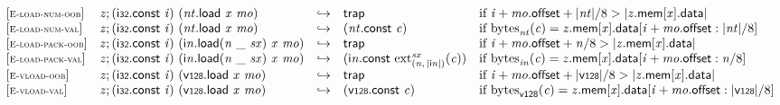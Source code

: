 $$
\begin{array}{@{}l@{}lcl@{}l@{}}
{[\textsc{\scriptsize E{-}load{-}num{-}oob}]} \quad & {\mathit{z}} ; (\mathsf{i{\scriptstyle32}}.\mathsf{const}~{\mathit{i}})~({\mathit{nt}}.\mathsf{load}~{\mathit{x}}~{\mathit{mo}}) &\hookrightarrow& \mathsf{trap} &\quad
  \mbox{if}~{\mathit{i}} + {\mathit{mo}}.\mathsf{offset} + {|{\mathit{nt}}|} / 8 > {|{{\mathit{z}}.\mathsf{mem}}{[{\mathit{x}}]}.\mathsf{data}|} \\
{[\textsc{\scriptsize E{-}load{-}num{-}val}]} \quad & {\mathit{z}} ; (\mathsf{i{\scriptstyle32}}.\mathsf{const}~{\mathit{i}})~({\mathit{nt}}.\mathsf{load}~{\mathit{x}}~{\mathit{mo}}) &\hookrightarrow& ({\mathit{nt}}.\mathsf{const}~{\mathit{c}}) &\quad
  \mbox{if}~{{\mathrm{bytes}}}_{{\mathit{nt}}}({\mathit{c}}) = {{\mathit{z}}.\mathsf{mem}}{[{\mathit{x}}]}.\mathsf{data}[{\mathit{i}} + {\mathit{mo}}.\mathsf{offset} : {|{\mathit{nt}}|} / 8] \\
{[\textsc{\scriptsize E{-}load{-}pack{-}oob}]} \quad & {\mathit{z}} ; (\mathsf{i{\scriptstyle32}}.\mathsf{const}~{\mathit{i}})~({{\mathsf{i}}{{\mathit{n}}}.\mathsf{load}}{({\mathit{n}}~\mathsf{\_}~{\mathit{sx}})}~{\mathit{x}}~{\mathit{mo}}) &\hookrightarrow& \mathsf{trap} &\quad
  \mbox{if}~{\mathit{i}} + {\mathit{mo}}.\mathsf{offset} + {\mathit{n}} / 8 > {|{{\mathit{z}}.\mathsf{mem}}{[{\mathit{x}}]}.\mathsf{data}|} \\
{[\textsc{\scriptsize E{-}load{-}pack{-}val}]} \quad & {\mathit{z}} ; (\mathsf{i{\scriptstyle32}}.\mathsf{const}~{\mathit{i}})~({{\mathsf{i}}{{\mathit{n}}}.\mathsf{load}}{({\mathit{n}}~\mathsf{\_}~{\mathit{sx}})}~{\mathit{x}}~{\mathit{mo}}) &\hookrightarrow& ({\mathsf{i}}{{\mathit{n}}}.\mathsf{const}~{{{{\mathrm{ext}}}_{({\mathit{n}},\, {|{\mathsf{i}}{{\mathit{n}}}|})}^{{\mathit{sx}}}}}{({\mathit{c}})}) &\quad
  \mbox{if}~{{\mathrm{bytes}}}_{{{\mathit{i}}}{{\mathit{n}}}}({\mathit{c}}) = {{\mathit{z}}.\mathsf{mem}}{[{\mathit{x}}]}.\mathsf{data}[{\mathit{i}} + {\mathit{mo}}.\mathsf{offset} : {\mathit{n}} / 8] \\
{[\textsc{\scriptsize E{-}vload{-}oob}]} \quad & {\mathit{z}} ; (\mathsf{i{\scriptstyle32}}.\mathsf{const}~{\mathit{i}})~(\mathsf{v{\scriptstyle128}.load}~{\mathit{x}}~{\mathit{mo}}) &\hookrightarrow& \mathsf{trap} &\quad
  \mbox{if}~{\mathit{i}} + {\mathit{mo}}.\mathsf{offset} + {|\mathsf{v{\scriptstyle128}}|} / 8 > {|{{\mathit{z}}.\mathsf{mem}}{[{\mathit{x}}]}.\mathsf{data}|} \\
{[\textsc{\scriptsize E{-}vload{-}val}]} \quad & {\mathit{z}} ; (\mathsf{i{\scriptstyle32}}.\mathsf{const}~{\mathit{i}})~(\mathsf{v{\scriptstyle128}.load}~{\mathit{x}}~{\mathit{mo}}) &\hookrightarrow& (\mathsf{v{\scriptstyle128}}.\mathsf{const}~{\mathit{c}}) &\quad
  \mbox{if}~{{\mathrm{bytes}}}_{\mathsf{v{\scriptstyle128}}}({\mathit{c}}) = {{\mathit{z}}.\mathsf{mem}}{[{\mathit{x}}]}.\mathsf{data}[{\mathit{i}} + {\mathit{mo}}.\mathsf{offset} : {|\mathsf{v{\scriptstyle128}}|} / 8] \\
\end{array}
$$

